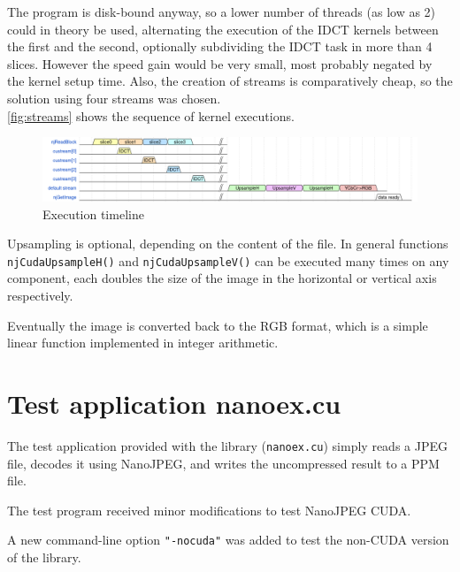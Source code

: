 The program is disk-bound anyway, so a lower number of threads (as low as 2) could in theory be used, alternating the execution of the IDCT kernels between the first and the second, optionally subdividing the IDCT task in more than 4 slices. However the speed gain would be very small, most probably negated by the kernel setup time. Also, the creation of streams is comparatively cheap, so the solution using four streams was chosen.\\
\autoref{fig:streams} shows the sequence of kernel executions.

\begin{figure}
    \centering
    \includegraphics[width=1\textwidth]{Pictures/wavedrom_sequenza.png}
    \caption{Execution timeline}
    \label{fig:streams}
\end{figure}

Upsampling is optional, depending on the content of the file. In general functions \texttt{njCudaUpsampleH()} and \texttt{njCudaUpsampleV()} can be executed many times on any component, each doubles the size of the image in the horizontal or vertical axis respectively.

Eventually the image is converted back to the RGB format, which is a simple linear function implemented in integer arithmetic.

\section{Test application nanoex.cu}
The test application provided with the library (\texttt{nanoex.cu}) simply reads a JPEG file, decodes it using NanoJPEG, and writes the uncompressed result to a PPM file.

The test program received minor modifications to test NanoJPEG CUDA.

A new command-line option \texttt{"-nocuda"} was added to test the non-CUDA version of the library.